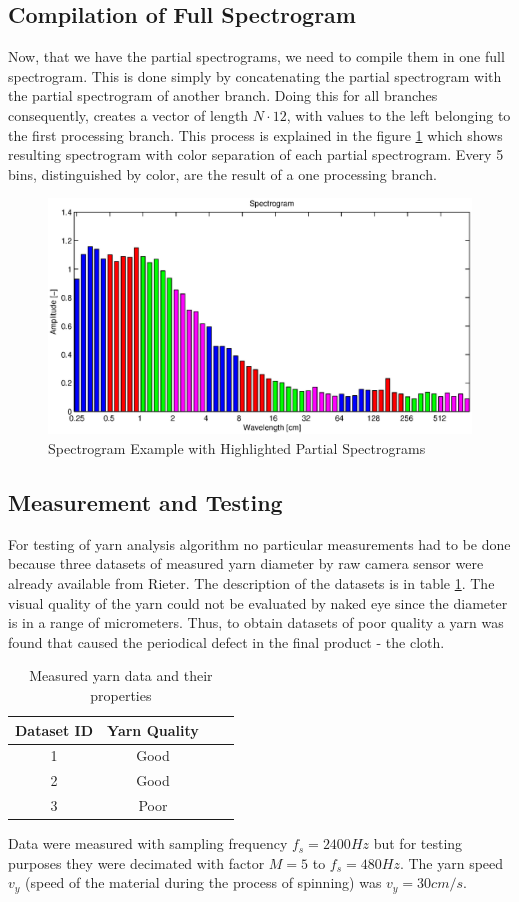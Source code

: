 \documentclass[twoside]{ctuthesis}
\theoremstyle{plain}
\theoremstyle{definition}
\theoremstyle{note}
\begin{document}
\subsection{Compilation of Full Spectrogram}
Now, that we have the partial spectrograms, we need to compile them in one full spectrogram. This is done simply by concatenating the partial spectrogram with the partial spectrogram of another branch. Doing this for all branches consequently, creates a vector of length $N\cdot 12$, with values to the left belonging to the first processing branch. This process is explained in the figure \ref{fig:yarnSpec_color} which shows resulting spectrogram with color separation of each partial spectrogram. Every 5 bins, distinguished by color, are the result of a one processing branch.
\begin{figure}[h]
	\centering
	\includegraphics[width=1.0\textwidth]{sp_barevny.eps}
	\caption{Spectrogram Example with Highlighted Partial Spectrograms}
	\label{fig:yarnSpec_color}
\end{figure}

\subsection{Measurement and Testing}
For testing of yarn analysis algorithm no particular measurements had to be done because three datasets of measured yarn diameter by raw camera sensor were already available from Rieter. The description of the datasets is in table \ref{tab:measuredDataYarn}. The visual quality of the yarn could not be evaluated by naked eye since the diameter is in a range of micrometers. Thus, to obtain datasets of poor quality a yarn was found that caused the periodical defect in the final product - the cloth.
\begin{table}[htbp]
	\centering
	\caption{Measured yarn data and their properties}
	\begin{tabular}{cccc}
		\toprule
		Dataset ID & Yarn Quality \\
		\midrule
		1     & Good \\
		2     & Good \\
		3     & Poor \\
		\bottomrule
	\end{tabular}%
	\label{tab:measuredDataYarn}%
\end{table}%
Data were measured with sampling frequency $f_s=2400 Hz$ but for testing purposes they were decimated with factor $M = 5$ to $f_s=480Hz$. The yarn speed $v_y$ (speed of the material during the process of spinning) was $v_y=30cm/s$.
\end{document}
